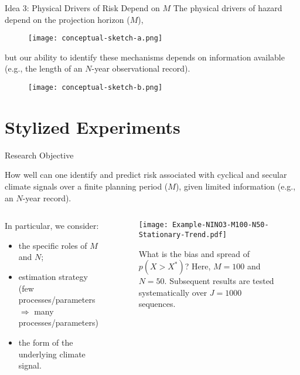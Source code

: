 \documentclass[
  10pt,     %
]{beamer}
\makeatletter
\newcommand*{\eg}{e.g.\@\xspace}
\makeatother
\begin{document}
\begin{frame}{Idea 3: Physical Drivers of Risk Depend on $M$}
  The physical drivers of hazard depend on the projection horizon ($M$),
  \begin{figure}
    \centering
    \texttt{[image: conceptual-sketch-a.png]}\\
  \end{figure}
  \pause
  but our ability to identify these mechanisms depends on information available (\eg, the length of an $N$-year observational record).
  \begin{figure}
    \centering
    \texttt{[image: conceptual-sketch-b.png]}
  \end{figure}
\end{frame}

\section{Stylized Experiments}

\begin{frame}{Research Objective}
  \begin{alertblock}{How well can one identify and predict risk}
     associated with cyclical and secular climate signals over a finite planning period ($M$),  given limited information (\eg, an $N$-year record).
  \end{alertblock}
  \pause
  \begin{columns}
    \begin{column}{0.5\textwidth}
      In particular, we consider:
      \begin{itemize}
        \item the specific roles of $M$ and $N$;
        \pause
        \item estimation strategy (few processes/parameters $\Rightarrow$ many processes/parameters)
        \pause
        \item the form of the underlying climate signal.
      \end{itemize}
    \end{column}
    \pause
    \begin{column}{0.5\textwidth}
      \begin{figure}
        \texttt{[image: Example-NINO3-M100-N50-Stationary-Trend.pdf]}
        \caption{
          What is the bias and spread of $p(X > X^*)$?
          Here, $M=100$ and $N=50$.
          Subsequent results are tested systematically over $J=1000$ sequences.
        }
      \end{figure}
    \end{column}
  \end{columns}
\end{frame}
\end{document}
